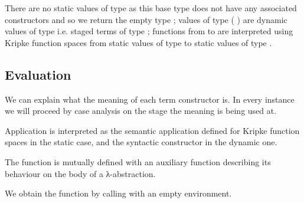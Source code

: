 \documentclass{article}
\begin{document}
There are no static values of type  as this base type does
not have any associated constructors and so we return the empty type ;
values of type ( ) are dynamic values of type 
i.e. staged terms of type ;
functions from  to  are interpreted using Kripke function
spaces from static values of type  to static values of type .






\subsection{Evaluation}

We can explain what the meaning of each term constructor is.
In every instance we will proceed by case analysis on the
stage the meaning is being used at.


Application is interpreted as the semantic application defined
for Kripke function spaces in the static case, and the syntactic
 constructor in the dynamic one.






\begin{AgdaSuppressSpace}
\end{AgdaSuppressSpace}

The function  is mutually defined with an auxiliary
function describing its behaviour on the body of a λ-abstraction.

\begin{AgdaSuppressSpace}
\end{AgdaSuppressSpace}

We obtain the  function by calling  with an
empty environment.

\begin{AgdaSuppressSpace}
\end{AgdaSuppressSpace}
\end{document}
